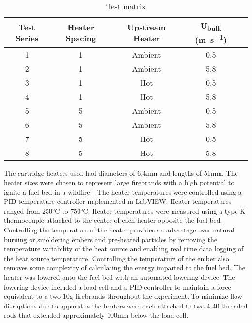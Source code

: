         \begin{table}[hpbt]
            \normalsize
            \caption{Test matrix}
            \centering
            \begin{tabular}{ccccr}
                \rowcolor{gray!50}
               Test Series & Heater Spacing & Upstream Heater & U\textsubscript{bulk} (\si{\meter\per\second})\\
                \hline
                1   & 1 & Ambient & 0.5 \\
                2   & 1 & Ambient & 5.8 \\
                3   & 1 & Hot     & 0.5 \\
                4   & 1 & Hot     & 5.8 \\
                5   & 5 & Ambient & 0.5 \\
                6   & 5 & Ambient & 5.8 \\
                7   & 5 & Hot     & 0.5 \\
                8   & 5 & Hot     & 5.8 \\
            \end{tabular}
            \label{tab:multiHeaterConfig}
        \end{table}
    
    The cartridge heaters used had diameters of 6.4\si{\milli\meter} and lengths of 51\si{\milli\meter}. The heater sizes were chosen to represent large firebrands with a high potential to ignite a fuel bed in a wildfire~\cite{Manzello2007}. The heater temperatures were controlled using a PID temperature controller implemented in LabVIEW. Heater temperatures ranged from 250\si{\celsius} to 750\si{\celsius}. Heater temperatures were measured using a type-K thermocouple attached to the center of each heater opposite the fuel bed.
    Controlling the temperature of the heater provides an advantage over natural burning or smoldering embers and pre-heated particles by removing the temperature variability of the heat source and enabling real time data logging of the heat source temperature. Controlling the temperature of the ember also removes some complexity of calculating the energy imparted to the fuel bed. The heater was lowered onto the fuel bed with an automated lowering device. The lowering device included a load cell and a PID controller to maintain a force equivalent to a two 10\si{\gram} firebrands throughout the experiment. To minimize flow disruptions due to apparatus the heaters were each attached to two 4-40 threaded rods that extended approximately 100\si{\milli\meter} below the load cell. 
    

